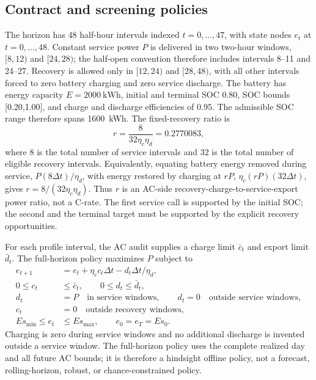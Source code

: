 \documentclass[11pt]{article}
\begin{document}
\subsection{Contract and screening policies}
The horizon has 48 half-hour intervals indexed $t=0,\ldots,47$, with state nodes $e_t$ at $t=0,\ldots,48$. Constant service power $P$ is delivered in two two-hour windows, $[8,12)$ and $[24,28)$; the half-open convention therefore includes intervals 8--11 and 24--27. Recovery is allowed only in $[12,24)$ and $[28,48)$, with all other intervals forced to zero battery charging and zero service discharge. The battery has energy capacity $E=2000~\mathrm{kWh}$, initial and terminal SOC 0.80, SOC bounds [0.20,1.00], and charge and discharge efficiencies of 0.95. The admissible SOC range therefore spans 1600~kWh. The fixed-recovery ratio is
\begin{equation}
r=\frac{8}{32\eta_c\eta_d}=0.2770083,
\end{equation}
where $8$ is the total number of service intervals and $32$ is the total number of eligible recovery intervals. Equivalently, equating battery energy removed during service, $P(8\Delta t)/\eta_d$, with energy restored by charging at $rP$, $\eta_c(rP)(32\Delta t)$, gives $r=8/(32\eta_c\eta_d)$. Thus $r$ is an AC-side recovery-charge-to-service-export power ratio, not a C-rate. The first service call is supported by the initial SOC; the second and the terminal target must be supported by the explicit recovery opportunities.

For each profile interval, the AC audit supplies a charge limit $\bar c_t$ and export limit $\bar d_t$. The full-horizon policy maximizes $P$ subject to
\begin{align}
e_{t+1}&=e_t+\eta_c c_t\Delta t-d_t\Delta t/\eta_d,\\
0\le c_t&\le\bar c_t,\qquad 0\le d_t\le\bar d_t,\\
d_t&=P\quad\text{in service windows},\qquad d_t=0\quad\text{outside service windows},\\
c_t&=0\quad\text{outside recovery windows},\\
E s_{\min}\le e_t&\le E s_{\max},\qquad e_0=e_T=E s_0.
\end{align}
Charging is zero during service windows and no additional discharge is invented outside a service window. The full-horizon policy uses the complete realized day and all future AC bounds; it is therefore a hindsight offline policy, not a forecast, rolling-horizon, robust, or chance-constrained policy.
\end{document}
